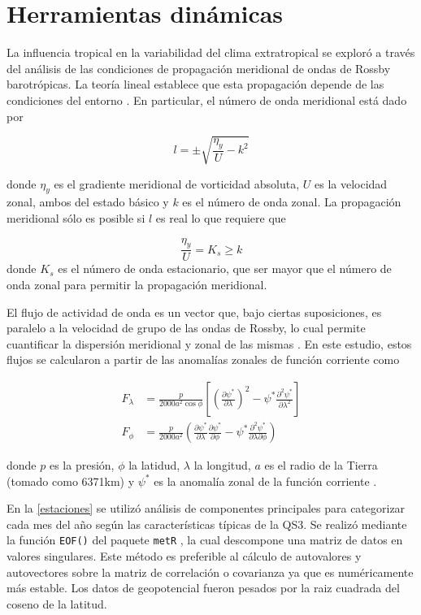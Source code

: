 \documentclass[spanish,a4paper,12pt,oneside]{book}
\begin{document}
\section*{Herramientas dinámicas}

La influencia tropical en la variabilidad del clima extratropical se
exploró a través del análisis de las condiciones de propagación
meridional de ondas de Rossby barotrópicas. La teoría lineal establece
que esta propagación depende de las condiciones del entorno
\autocite{James}. En particular, el número de onda meridional está dado
por

\[
l = \pm \sqrt{\frac{\eta_{y}}{U} - k^2}
\]

donde \(\eta_{y}\) es el gradiente meridional de vorticidad absoluta,
\(U\) es la velocidad zonal, ambos del estado básico y \(k\) es el
número de onda zonal. La propagación meridional sólo es posible si \(l\)
es real lo que requiere que

\[
\frac{\eta_{y}}{U} = K_s \ge k 
\] donde \(K_s\) es el número de onda estacionario, que ser mayor que el
número de onda zonal para permitir la propagación meridional.

El flujo de actividad de onda es un vector que, bajo ciertas
suposiciones, es paralelo a la velocidad de grupo de las ondas de
Rossby, lo cual permite cuantificar la dispersión meridional y zonal de
las mismas \autocite{James}. En este estudio, estos flujos se calcularon
a partir de las anomalías zonales de función corriente como

\[
\begin{aligned}
F_\lambda &= \frac{p}{2000a^2\cos\phi}\left[ \left( \frac{\partial \psi^*}{\partial \lambda} \right)^2 - \psi^*\frac{\partial^2 \psi^*}{\partial \lambda^2}  \right] \\
F_\phi &= \frac{p}{2000a^2} \left( \frac{\partial \psi^*}{\partial \lambda}\frac{\partial \psi^*}{\partial \phi}  - \psi^* \frac{\partial^2 \psi^*}{\partial \lambda \partial \phi} \right) 
\end{aligned}
\]

donde \(p\) es la presión, \(\phi\) la latidud, \(\lambda\) la longitud,
\(a\) es el radio de la Tierra (tomado como 6371km) y \(\psi^*\) es la
anomalía zonal de la función corriente \autocite{Vera2004}.

En la \autoref{estaciones} se utilizó análisis de componentes
principales para categorizar cada mes del año según las características
típicas de la QS3. Se realizó mediante la función \texttt{EOF()} del
paquete \texttt{metR} \autocite{R-metR}, la cual descompone una matriz
de datos en valores singulares. Este método es preferible al cálculo de
autovalores y autovectores sobre la matriz de correlación o covarianza
ya que es numéricamente más estable. Los datos de geopotencial fueron
pesados por la raiz cuadrada del coseno de la latitud.
\end{document}

